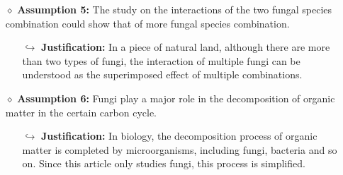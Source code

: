 \begin{itemize}
\begin{itemize}
        \end{itemize}
  \item[$\diamond$] \textbf{Assumption 5:} The study on the interactions of the two fungal species combination could show that of more fungal species combination.
        \begin{itemize}
          \item[$\hookrightarrow$] \textbf{Justification:} In a piece of natural land, although there are more than two types of fungi, the interaction of multiple fungi can be understood as the superimposed effect of multiple combinations.
        \end{itemize}
  \item[$\diamond$] \textbf{Assumption 6:} Fungi play a major role in the decomposition of organic matter in the certain carbon cycle.
        \begin{itemize}
          \item[$\hookrightarrow$] \textbf{Justification:} In biology, the decomposition process of organic matter is completed by microorganisms, including fungi, bacteria and so on. Since this article only studies fungi, this process is simplified.
        \end{itemize}
\end{itemize}
